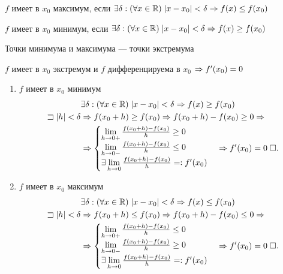 \documentclass{article}
\begin{document}


$f$ имеет в $x_0$ максимум, если $\exists\delta:(\forall x\in\mathbb{R})\;|x-x_0|<\delta\Rightarrow f(x)\leq f(x_0)$

$f$ имеет в $x_0$ минимум, если $\exists\delta:(\forall x\in\mathbb{R})\;|x-x_0|<\delta\Rightarrow f(x)\geq f(x_0)$

Точки минимума и максимума --- точки экстремума

\theorem

$f$ имеет в $x_0$ экстремум и $f$ дифференцируема в $x_0$ $\Rightarrow f'(x_0)=0$

\proof
\begin{enumerate}
	\item$f$ имеет в $x_0$ минимум
	\begin{align*}
		 & \exists\delta: (\forall x\in\mathbb{R})\;|x-x_0|<\delta\Rightarrow f(x)\geq f(x_0) \\
		\sqsupset |h| < \delta
		 & \Rightarrow f(x_0+h)\geq f(x_0) \Rightarrow f(x_0+h)-f(x_0) \geq 0\Rightarrow          \\
		 & \Rightarrow\begin{cases}
			        \lim\limits_{h\to0+}\frac{f(x_0+h)-f(x_0)}{h}\geq0 \\
			        \lim\limits_{h\to0-}\frac{f(x_0+h)-f(x_0)}{h}\leq0 \\
			        \exists\lim\limits_{h\to0}\frac{f(x_0+h)-f(x_0)}{h}=:f'(x_0)
		        \end{cases} \Rightarrow f'(x_0)=0\;\square.
	\end{align*}
	\item$f$ имеет в $x_0$ максимум
	\begin{align*}
		 & \exists\delta: (\forall x\in\mathbb{R})\;|x-x_0|<\delta\Rightarrow f(x)\leq f(x_0) \\
		\sqsupset |h| < \delta
		 & \Rightarrow f(x_0+h)\leq f(x_0) \Rightarrow f(x_0+h)-f(x_0) \leq 0\Rightarrow          \\
		 & \Rightarrow\begin{cases}
			        \lim\limits_{h\to0+}\frac{f(x_0+h)-f(x_0)}{h}\leq0 \\
			        \lim\limits_{h\to0-}\frac{f(x_0+h)-f(x_0)}{h}\geq0 \\
			        \exists\lim\limits_{h\to0}\frac{f(x_0+h)-f(x_0)}{h}=:f'(x_0)
		        \end{cases} \Rightarrow f'(x_0)=0\;\square.
	\end{align*}
\end{enumerate}
\end{document}
